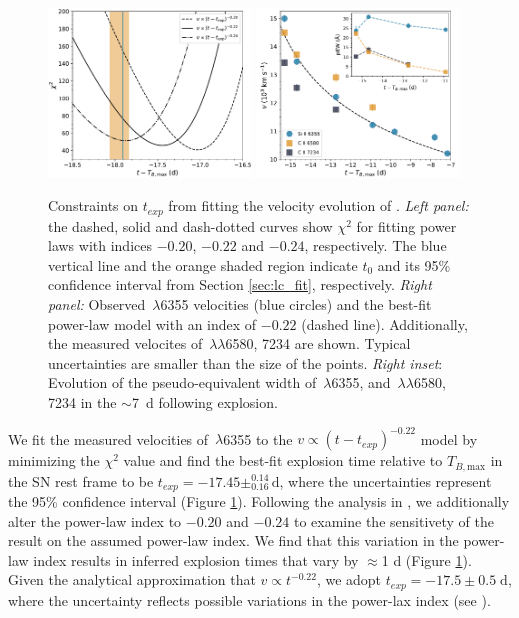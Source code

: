 \documentclass[twocolumn]{aastex61}
\begin{document}
\begin{figure}[!thb]
  \centering
  \includegraphics[width=0.48\textwidth]{Chi2.pdf}
  \includegraphics[width=0.48\textwidth]{VelocityPlot.pdf}
  \caption{Constraints on $t_{exp}$ from fitting the velocity
    evolution of .
    \textit{Left panel:} the dashed, solid and dash-dotted curves 
    show $\chi^2$ for fitting power laws with
    indices $-0.20$, $-0.22$ and $-0.24$, respectively. The blue
    vertical line and the orange shaded region indicate $t_0$ and 
    its 95\% confidence interval from Section
    \ref{sec:lc_fit}, respectively.
    \textit{Right panel:} Observed \,$\lambda$6355
    velocities (blue circles) and the best-fit power-law model
     with an index of $-0.22$ (dashed line). Additionally, the 
     measured velocites of \,$\lambda\lambda$6580, 7234 
     are shown. Typical uncertainties are smaller than the size of 
     the points. \textit{Right inset}: Evolution of the 
     pseudo-equivalent width of \,$\lambda$6355, and 
     \,$\lambda\lambda$6580, 7234 in the $\sim$7~d    
     following explosion.}
  \label{fig:velocity_t_exp}
\end{figure}

We fit the measured velocities of \,$\lambda$6355 to the
$v\propto(t-t_{exp})^{-0.22}$ model by minimizing the $\chi^2$ value and find the best-fit explosion time relative to $T_{B,\mathrm{max}}$ in the SN rest frame to be $t_{exp} = -17.45 \pm ^{0.14}_{0.16}\,\textrm{d}$, where the uncertainties represent the 95\% confidence interval (Figure \ref{fig:velocity_t_exp}). Following the analysis in \citet{2014ApJ...784...85P}, we additionally alter the power-law index to $-0.20$ and $-0.24$ to examine the sensitivety of the result on the assumed power-law index. We find that this variation in the power-law index results in inferred explosion times that vary by $\approx$1 d (Figure \ref{fig:velocity_t_exp}). Given the analytical approximation that $v \propto t^{-0.22}$, we adopt $t_{exp} = -17.5 \pm 0.5 \; \mathrm{d}$, where the uncertainty reflects possible variations in the power-lax index (see \citealt{2014ApJ...784...85P}).
\end{document}
